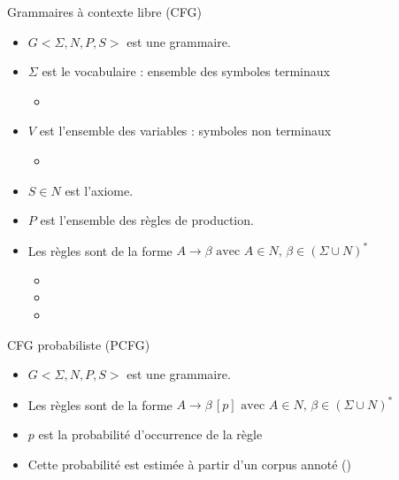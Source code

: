 \documentclass{KodeBook}
\begin{document}
Grammaires à contexte libre (CFG)
\begin{minipage}{.68\textwidth}
	\begin{itemize}
		\item $G <\Sigma, N, P, S>$ est une grammaire.
		\item $\Sigma$ est le vocabulaire : ensemble des symboles terminaux
		\begin{itemize}
			\item {}
		\end{itemize}
		\item $V$ est l'ensemble des  variables : symboles non terminaux 
		\begin{itemize}
			\item {}
		\end{itemize}
	\end{itemize}
\end{minipage}
\begin{minipage}{.3\textwidth}
\end{minipage}

\begin{itemize}
	\item $S \in N$ est l'axiome.
	\item $P$ est l'ensemble des règles de production.
	\item Les règles sont de la forme $A \rightarrow \beta \text{ avec } A \in N,\, \beta \in (\Sigma \cup N)^*$
	\begin{itemize}
		\item {}
		\item {}
		\item {}
	\end{itemize}
\end{itemize}

CFG probabiliste (PCFG)

\begin{itemize}
	\item $G <\Sigma, N, P, S>$ est une grammaire.
	\item Les règles sont de la forme $A \rightarrow \beta\, [p] \text{ avec } A \in N,\, \beta \in (\Sigma \cup N)^*$
	\item $p$ est la probabilité d'occurrence de la règle
	\item Cette probabilité est estimée à partir d'un corpus annoté ()
\end{itemize}
\end{document}
